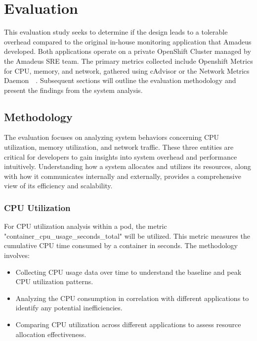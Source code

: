 
\chapter{Evaluation}\label{chapter:evaluation}

This evaluation study seeks to determine if the design leads to a tolerable overhead compared to the original in-house monitoring application that Amadeus developed. Both applications operate on a private OpenShift Cluster managed by the Amadeus \ac{SRE} team. The primary metrics collected include Openshift Metrics for \ac{CPU}, memory, and network, gathered using cAdvisor or the Network Metrics Daemon~\parencite{redhatAssociatingSecondaryInterfaces}~\parencite{redhatPrometheusClusterMonitoring}. Subsequent sections will outline the evaluation methodology and present the findings from the system analysis.


\section{Methodology}

The evaluation focuses on analyzing system behaviors concerning \ac{CPU} utilization, memory utilization, and network traffic. These three entities are critical for developers to gain insights into system overhead and performance intuitively. Understanding how a system allocates and utilizes its resources, along with how it communicates internally and externally, provides a comprehensive view of its efficiency and scalability.

\subsection{\ac{CPU} Utilization}

For \ac{CPU} utilization analysis within a pod, the metric "container\_cpu\_usage\_seconds\_total" will be utilized. This metric measures the cumulative \ac{CPU} time consumed by a container in seconds. The methodology involves:

\begin{itemize}
    \item Collecting \ac{CPU} usage data over time to understand the baseline and peak \ac{CPU} utilization patterns.
    \item Analyzing the \ac{CPU} consumption in correlation with different applications to identify any potential inefficiencies.
    \item Comparing \ac{CPU} utilization across different applications to assess resource allocation effectiveness.
\end{itemize}

